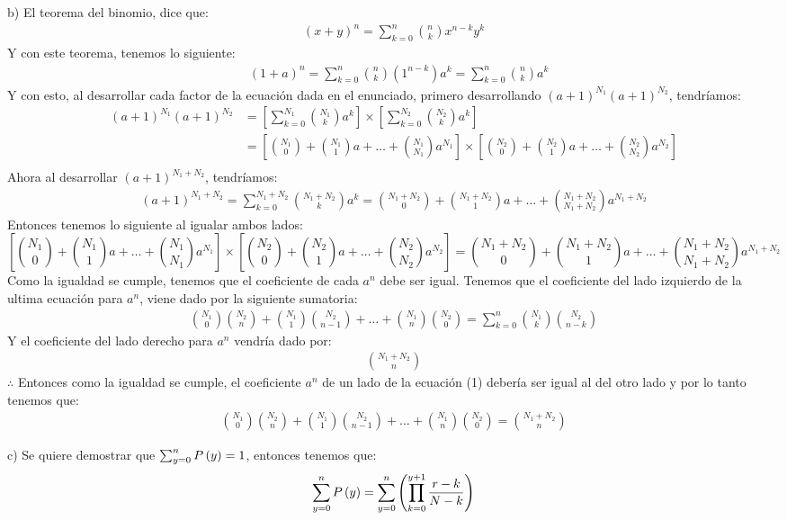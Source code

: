 \newpage
b) El teorema del binomio, dice que:
\begin{align*}
	(x+y)^n = \sum_{k=0}^{n} \binom{n}{k} x^{n-k} y^k 
\end{align*}
Y con este teorema, tenemos lo siguiente:
\begin{align*}
	&\left( 1+a \right)^n = \sum_{k=0}^{n} \binom{n}{k} \left( 1^{n-k} \right) a^k
	                      = \sum_{k=0}^{n} \binom{n}{k} a^k
\end{align*}
Y con esto, al desarrollar cada factor de la ecuación dada en el enunciado, primero desarrollando $(a+1)^{N_1} (a+1)^{N_2}$, tendríamos:
\begin{align*}
	(a+1)^{N_1} (a+1)^{N_2} 
	& = \left[ \sum_{k=0}^{N_1} \binom{N_1}{k} a^k \right] \times \left[ \sum_{k=0}^{N_2} \binom{N_2}{k} a^k \right] \\
	& = \left[ \binom{N_1}{0} + \binom{N_1}{1} a + \ldots + \binom{N_1}{N_1} a^{N_1} \right]
	    \times \left[ \binom{N_2}{0} + \binom{N_2}{1} a + \ldots + \binom{N_2}{N_2} a^{N_2} \right] \\
\end{align*}
Ahora al desarrollar $(a+1)^{N_1 + N_2}$, tendríamos:
\begin{align*}
	(a+1)^{N_1 + N_2} = \sum_{k=0}^{N_1 + N_2} \binom{N_1 + N_2}{k} a^k
	              = \binom{N_1 + N_2}{0} + \binom{N_1 + N_2}{1} a + \ldots + \binom{N_1 + N_2}{N_1 + N_2} a^{N_1 + N_2}
\end{align*}
Entonces tenemos lo siguiente al igualar ambos lados:
\begin{dmath}
	\left[ \binom{N_1}{0} + \binom{N_1}{1} a + \ldots + \binom{N_1}{N_1} a^{N_1} \right]
	\times \left[ \binom{N_2}{0} + \binom{N_2}{1} a + \ldots + \binom{N_2}{N_2} a^{N_2} \right]
	= \binom{N_1 + N_2}{0} + \binom{N_1 + N_2}{1} a + \ldots + \binom{N_1 + N_2}{N_1 + N_2} a^{N_1 + N_2}
\end{dmath}
Como la igualdad se cumple, tenemos que el coeficiente de cada $a^n$ debe ser igual. Tenemos que el coeficiente del lado izquierdo de la ultima ecuación para $a^n$, viene dado por la siguiente sumatoria:
\begin{align*}
	\binom{N_1}{0} \binom{N_2}{n} + \binom{N_1}{1} \binom{N_2}{n - 1} + \ldots
	+ \binom{N_1}{n} \binom{N_2}{0} = \sum_{k=0}^{n} \binom{N_1}{k} \binom{N_2}{n-k} 
\end{align*}
Y el coeficiente del lado derecho para $a^n$ vendría dado por:
\begin{align*}
	\binom{N_1 + N_2}{n}
\end{align*}
$\therefore$ Entonces como la igualdad se cumple, el coeficiente $a^n$ de un lado de la ecuación (1) debería ser igual al del otro lado y por lo tanto tenemos que:
\begin{align*}
\binom{N_1}{0} \binom{N_2}{n} + \binom{N_1}{1} \binom{N_2}{n - 1} + \ldots
+ \binom{N_1}{n} \binom{N_2}{0} = \binom{N_1 + N_2}{n}
\end{align*}


\newpage
c) Se quiere demostrar que  $\sum_{y=0}^{n} {P} \left( {y} \right) = 1$, entonces tenemos que:
\begin{align*}
	\sum_{y=0}^{n} {P} \left( {y} \right) = \sum_{y=0}^{n} \left( \prod_{k=0}^{y+1} \frac{r-k}{N-k} \right)
\end{align*}
